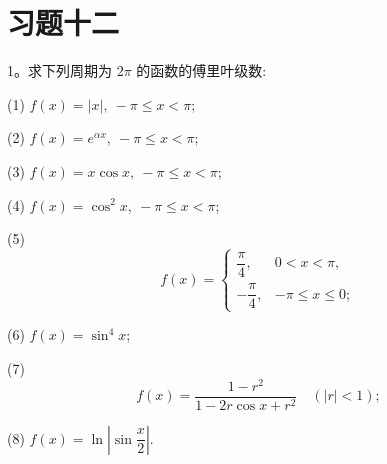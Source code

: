 \section*{习题十二}
{}
\label{exercises:ma-12}

1。求下列周期为 $2\pi$ 的函数的傅里叶级数:

(1) $f(x)=|x|,\ -\pi\leqslant x<\pi$;

(2) $f(x)=e^{\alpha x},\ -\pi\leqslant x<\pi$;

(3) $f(x)=x\cos x,\ -\pi\leqslant x<\pi$;

(4) $f(x)=\cos^2x,\ -\pi\leqslant x<\pi$;

(5)
\[
  f(x)=
  \begin{cases}
    \dfrac{\pi}{4}, & 0<x<\pi,\\
    -\dfrac{\pi}{4}, & -\pi\leqslant x\leqslant0;
  \end{cases}
\]

(6) $f(x)=\sin^4x$;

(7)
\[
  f(x)=\frac{1-r^2}{1-2r\cos x+r^2}\quad(|r|<1);
\]

(8) $f(x)=\ln\left|\sin\dfrac x2\right|$.

